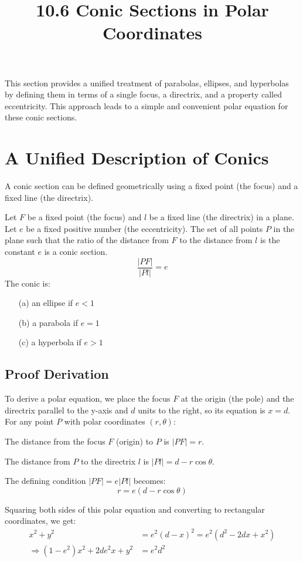 \documentclass{article}
\title{10.6 Conic Sections in Polar Coordinates}
\date{}
\author{}
\begin{document}
\maketitle

This section provides a unified treatment of parabolas, ellipses, and hyperbolas by defining them in terms of a single focus, a directrix, and a property called eccentricity. This approach leads to a simple and convenient polar equation for these conic sections.

\section*{A Unified Description of Conics}

A conic section can be defined geometrically using a fixed point (the focus) and a fixed line (the directrix).

Let $F$ be a fixed point (the focus) and $l$ be a fixed line (the directrix) in a plane. Let $e$ be a fixed positive number (the eccentricity). The set of all points $P$ in the plane such that the ratio of the distance from $F$ to the distance from $l$ is the constant $e$ is a conic section.
\[
\frac{|PF|}{|Pl|} = e
\]
The conic is:
\begin{itemize}
    \item[(a)] an ellipse if $e < 1$
    \item[(b)] a parabola if $e = 1$
    \item[(c)] a hyperbola if $e > 1$
\end{itemize}

\subsection*{Proof Derivation}

To derive a polar equation, we place the focus $F$ at the origin (the pole) and the directrix parallel to the y-axis and $d$ units to the right, so its equation is $x=d$. For any point $P$ with polar coordinates $(r, \theta)$:

The distance from the focus $F$ (origin) to $P$ is $|PF| = r$.

The distance from $P$ to the directrix $l$ is $|Pl| = d - r \cos\theta$.

The defining condition $|PF| = e|Pl|$ becomes:
\begin{equation}
r = e(d - r \cos\theta)
\end{equation}

Squaring both sides of this polar equation and converting to rectangular coordinates, we get:
\begin{align*}
    x^2 + y^2 &= e^2(d - x)^2 = e^2(d^2 - 2dx + x^2) \\
    \Rightarrow (1 - e^2)x^2 + 2de^2x + y^2 &= e^2d^2
\end{align*}
\end{document}
